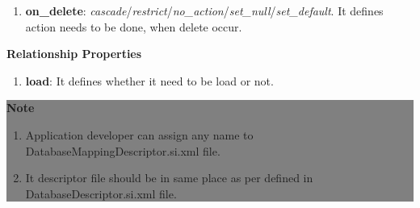 \begin{enumerate}
\begin{enumerate}
			\item \small \textbf{on\_delete}: \textit{cascade}/\textit{restrict}/\textit{no\_action}/\textit{set\_null}/\textit{set\_default}. It defines action needs to be done, when delete occur.
		
		\end{enumerate}

		\textbf{Relationship Properties}

		\begin{enumerate}

			\item \small \textbf{load}: It defines whether it need to be load or not.
			
		\end{enumerate}
		
\end{enumerate}

\newpage
\begin{center}
		\colorbox{grey}{
			\parbox[t]{.8\linewidth}{
				\fontsize{11pt}{11pt}\selectfont %
				\vspace*{0.1cm} %
		
				\hfill \textbf{Note} \\

				\hfill 

				\begin{enumerate}

					\item \small Application developer can assign any name to DatabaseMappingDescriptor.si.xml file.

					\item \small It descriptor file should be in same place as per defined in DatabaseDescriptor.si.xml file.
	
				\end{enumerate}

				\vspace*{0.0cm} %
			}
		}

\end{center}

